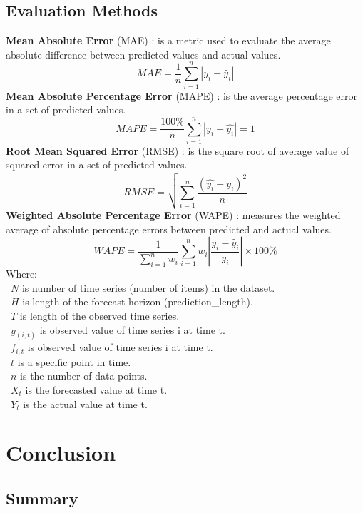 \documentclass{ieeeojies}
\begin{document}
\subsection{Evaluation Methods}
\textbf{Mean Absolute Error} (MAE) \cite{b11}: is a metric used to evaluate the average absolute difference between predicted values and actual values.\\
    \[MAE = \frac{1}{n} \sum_{i=1}^{n} |y_i - \hat{y}_i|\]
\textbf{Mean Absolute Percentage Error} (MAPE) \cite{b11}: is the average percentage error in a set of predicted values.\\
    \[MAPE=\frac{100\%}{n}  \sum_{i=1}^{n} |y_i-\hat{y_i} |  = 1 \]
\textbf{Root Mean Squared Error} (RMSE) \cite{b11}: is the square root of average value of squared error in a set of predicted values.\\
    \[RMSE=\sqrt{\sum_{i=1}^{n} \frac{(\hat{y_i}-y_i )^2}{n} }\]
\textbf{Weighted Absolute Percentage Error} (WAPE) \cite{b11}: measures the weighted average of absolute percentage errors between predicted and actual values.\\
    \[WAPE = \frac{1}{\sum_{i=1}^{n} w_i} \sum_{i=1}^{n} w_i \left| \frac{y_i - \hat{y}_i}{y_i} \right| \times 100\%\]
Where: \\
    \indent\ \(N\) is number of time series (number of items) in the dataset.\\
    \indent\ \(H\) is length of the forecast horizon (prediction\_length).\\
    \indent\ \(T\) is length of the observed time series.\\
    \indent\ \(y_(i,t)\) is observed value of time series i at time t.\\
    \indent\ \(f_{i,t}\) is observed value of time series i at time t.\\
    \indent\ \(t\) is a specific point in time.\\
    \indent\ \(n\) is the number of data points.\\
    \indent\ \(X_t\) is the forecasted value at time t.\\
    \indent\ \(Y_t\) is the actual value at time t.\\

\section{Conclusion}
\subsection{Summary}
\end{document}
